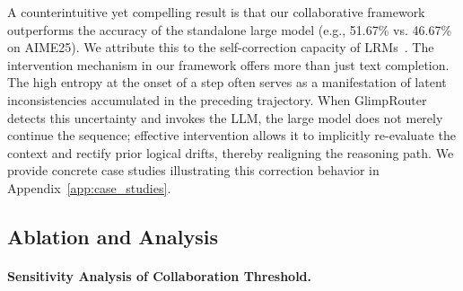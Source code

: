 \documentclass[11pt]{article}
\newcommand{\approach}{{GlimpRouter}\xspace}
\begin{document}
A counterintuitive yet compelling result is that our collaborative framework outperforms the accuracy of the standalone large model (e.g., 51.67\% vs. 46.67\% on AIME25). 
We attribute this to the self-correction capacity of LRMs~\cite{guo2025deepseek, zeng2025thinking}.
The intervention mechanism in our framework offers more than just text completion. The high entropy at the onset of a step often serves as a manifestation of latent inconsistencies accumulated in the preceding trajectory. When \approach detects this uncertainty and invokes the LLM, the large model does not merely continue the sequence; effective intervention allows it to implicitly re-evaluate the context and rectify prior logical drifts, thereby realigning the reasoning path.
We provide concrete case studies illustrating this correction behavior in Appendix~\ref{app:case_studies}. 

\subsection{Ablation and Analysis}
\label{sec:ablation_study}

\paragraph{Sensitivity Analysis of Collaboration Threshold.}
\label{ssec:sensitive}
\end{document}
